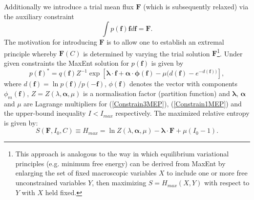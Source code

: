 \documentclass[a4paper,12pt]{article}
\begin{document}
Additionally we introduce a trial mean flux $\bm{F}$ (which is subsequently relaxed) via the auxiliary constraint
\begin{equation}
\label{Constrain3MEP}
  \int p(\bm{f})\bm{f} d\bm{f} = \bm{F}.
\end{equation}
The motivation for introducing $\bm{F}$ is to allow one to establish an extremal principle whereby $\bm{F}(C)$ is determined by varying the trial solution $\bm{F}$\footnote{This approach is analogous to the way in which equilibrium variational principles (e.g. minimum free energy) can be derived from MaxEnt by enlarging the set of fixed macroscopic variables $X$ to include one or more free unconstrained variables $Y$, then maximizing $S=H_{max}(X,Y)$ with respect to $Y$ with $X$ held fixed.}.
Under given constraints the MaxEnt solution for $p(\bm{f})$ is given by 
\begin{equation}
\label{MaxEntPDF1}
  p(\bm{f})^* = q( \bm{f} ) Z^{-1} \exp[\bm{\lambda} \cdot \bm{f}+ \bm{\alpha} \cdot \bm{\phi} (\bm{f}) - \mu ( d(\bm{f}) - e^{-d(\bm{f}))}],
\end{equation}
where $d(\bm{f})= \ln{p(\bm{f})/p(-\bm{f})}$, $\phi(\bm{f})$ denotes the vector with components $\phi_m(\bm{f})$, $Z = Z(\lambda, \bm{\alpha},\mu)$ is a normalisation factor (partition function) and $\bm{\lambda}$, $\bm{\alpha}$ and $\mu$ are Lagrange multipliers for (\ref{Constrain3MEP}), (\ref{Constrain1MEP}) and the upper-bound inequality $I<I_{max}$ respectively. The maximized relative entropy is given by:
\begin{equation}
  S(\bm{F}, I_0, C) \equiv H_{max} = \ln Z(\lambda, \bm{\alpha}, \mu) - \bm{\lambda} \cdot \bm{F} + \mu(I_0 -1).
\end{equation}
\end{document}
